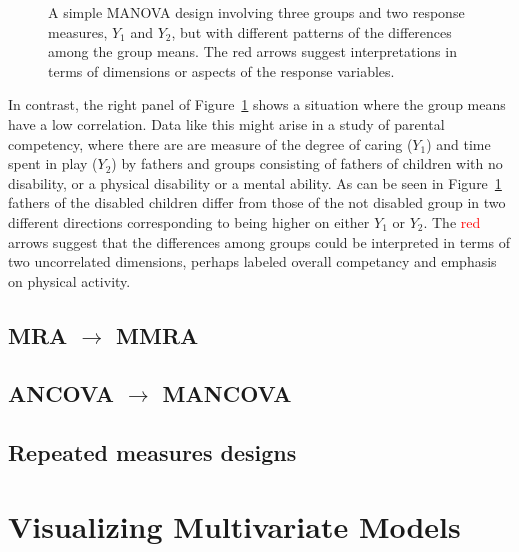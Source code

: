 \documentclass[
  letterpaper,
  10pt,
  krantz2]{krantz}
\begin{document}
{\begin{figure}
{}

\caption{\label{fig-manova-response-dimensions}A simple MANOVA design
involving three groups and two response measures, \(Y_1\) and \(Y_2\),
but with different patterns of the differences among the group means.
The red arrows suggest interpretations in terms of dimensions or aspects
of the response variables.}

\end{figure}%

In contrast, the right panel of
Figure~\ref{fig-manova-response-dimensions} shows a situation where the
group means have a low correlation. Data like this might arise in a
study of parental competency, where there are are measure of the degree
of caring (\(Y_1\)) and time spent in play (\(Y_2\)) by fathers and
groups consisting of fathers of children with no disability, or a
physical disability or a mental ability. As can be seen in
Figure~\ref{fig-manova-response-dimensions} fathers of the disabled
children differ from those of the not disabled group in two different
directions corresponding to being higher on either \(Y_1\) or \(Y_2\).
The \textcolor{red}{red} arrows suggest that the differences among
groups could be interpreted in terms of two uncorrelated dimensions,
perhaps labeled overall competancy and emphasis on physical activity.

\section{\texorpdfstring{MRA \(\rightarrow\)
MMRA}{MRA \textbackslash rightarrow MMRA}}\label{mra-rightarrow-mmra}

\section{\texorpdfstring{ANCOVA \(\rightarrow\)
MANCOVA}{ANCOVA \textbackslash rightarrow MANCOVA}}\label{ancova-rightarrow-mancova}

\section{Repeated measures designs}\label{repeated-measures-designs}


\chapter{Visualizing Multivariate Models}\label{sec-vis-mlm}

}
\end{document}
